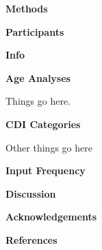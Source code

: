 \documentclass[10pt, a4paper]{article}
\begin{document}
\begin{multicols}{2}
\begin{center} 
\textbf{Methods}
\end{center}

\begin{center} 
\textbf{Participants}
\end{center}

\begin{center} 
\textbf{Info}
\end{center}


\begin{center} 
\textbf{Age Analyses}
\end{center}
Things go here.

\begin{center} 
\textbf{CDI Categories}
\end{center}
Other things go here

\begin{center} 
\textbf{Input Frequency}
\end{center}


\begin{center} 
\textbf{Discussion}
\end{center}


\begin{center} 
\textbf{Acknowledgements}
\end{center}


\begin{center} 
\textbf{References}
\end{center}
\end{multicols}
\end{document}
